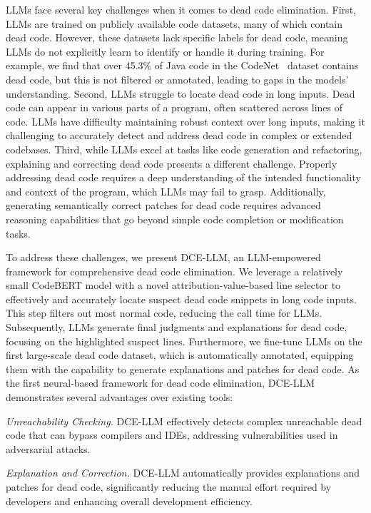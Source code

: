 \documentclass[11pt]{article}
\begin{document}

LLMs face several key challenges when it comes to dead code elimination. First, LLMs are trained on publicly available code datasets, many of which contain dead code. However, these datasets lack specific labels for dead code, meaning LLMs do not explicitly learn to identify or handle it during training. For example, we find that over 45.3\% of Java code in the CodeNet~\cite{puri2021codenet} dataset contains dead code, but this is not filtered or annotated, leading to gaps in the models' understanding.
Second, LLMs struggle to locate dead code in long inputs. Dead code can appear in various parts of a program, often scattered across lines of code. LLMs have difficulty maintaining robust context over long inputs, making it challenging to accurately detect and address dead code in complex or extended codebases.
Third, while LLMs excel at tasks like code generation and refactoring, explaining and correcting dead code presents a different challenge. Properly addressing dead code requires a deep understanding of the intended functionality and context of the program, which LLMs may fail to grasp. Additionally, generating semantically correct patches for dead code requires advanced reasoning capabilities that go beyond simple code completion or modification tasks.



To address these challenges, we present DCE-LLM, an LLM-empowered framework for comprehensive dead code elimination. We leverage a relatively small CodeBERT model with a novel attribution-value-based line selector to effectively and accurately locate suspect dead code snippets in long code inputs. This step filters out most normal code, reducing the call time for LLMs. Subsequently, LLMs generate final judgments and explanations for dead code, focusing on the highlighted suspect lines. Furthermore, we fine-tune LLMs on the first large-scale dead code dataset, which is automatically annotated, equipping them with the capability to generate explanations and patches for dead code. As the first neural-based framework for dead code elimination, DCE-LLM demonstrates several advantages over existing tools:

\textit{Unreachability Checking.} DCE-LLM effectively detects complex unreachable dead code that can bypass compilers and IDEs, addressing vulnerabilities used in adversarial attacks.

\textit{Explanation and Correction.} DCE-LLM automatically provides explanations and patches for dead code, significantly reducing the manual effort required by developers and enhancing overall development efficiency.
\end{document}
